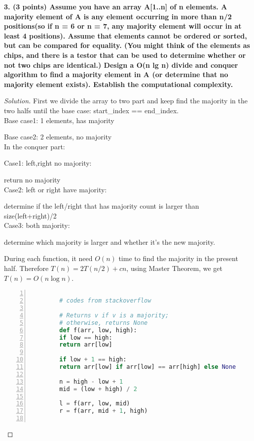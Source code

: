 \documentclass[12pt]{article}
\begin{document}
\textbf{3. (3 points) Assume you have an array A[1..n] of n elements. A majority element of A is any element occurring in more than n/2 positions(so if n = 6 or n = 7, any majority element will occur in at least 4 positions). Assume that elements cannot be ordered or sorted, but can be compared for equality. (You might think of the elements as chips, and there is a testor that can be used to determine whether or not two chips are identical.) Design a O(n lg n) divide and conquer algorithm to find a majority element in A (or determine that no majority element exists). Establish the computational complexity.}
\begin{proof}[Solution]
	First we divide the array to two part and keep find the majority in the two halfs until the base case: start\_index == end\_index. \\
	
	Base case1: 1 elements, has majority
	
	Base case2: 2 elements, no majority\\
	In the conquer part:
	
	Case1: left,right no majority:
	
				return no majority\\
	Case2: left or right have majority:
	
			determine if the left/right that has majority count is larger than size(left+right)/2\\
	Case3: both majority:
	
			determine which majority is larger and whether it's the new majority.
	
	During each function, it need $O(n)$ time to find the majority in the present half. Therefore $T(n)=2T(n/2)+cn$, using Master Theorem, we get $T(n) = O(n\log n)$.
	\begin{lstlisting}[language={python},numbers=left,numberstyle=\tiny,%frame=shadowbox,  
		rulesepcolor=\color{red!20!green!20!blue!20},  
		keywordstyle=\color{blue!70!black},  
		commentstyle=\color{blue!90!},  
		basicstyle=\ttfamily]  
		
		# codes from stackoverflow
		
		# Returns v if v is a majority;
		# otherwise, returns None
		def f(arr, low, high):
		if low == high:
		return arr[low]
		
		if low + 1 == high:
		return arr[low] if arr[low] == arr[high] else None
		
		n = high - low + 1
		mid = (low + high) / 2
		
		l = f(arr, low, mid)
		r = f(arr, mid + 1, high)
		

\end{lstlisting}
\end{proof}
\end{document}
